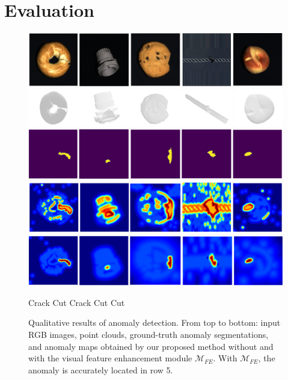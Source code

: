 \section*{Evaluation}
\label{sec:evaluation}

\begin{figure}[ht]
\centering
\includegraphics[width=\linewidth]{figs/result_rgb}
\includegraphics[width=\linewidth]{figs/result_pc}
\includegraphics[width=\linewidth]{figs/result_gt}
\includegraphics[width=\linewidth]{figs/result_baseline}
\includegraphics[width=\linewidth]{figs/result_ours}
\vspace{-0.5cm}

\begin{flushleft}
 \hspace{1.3cm} Crack \hspace{2.6cm} Cut  \hspace{2.6cm} Crack  \hspace{2.8cm} Cut  \hspace{2.5cm} Cut
 \end{flushleft}
 
 \vspace{-0.1cm}
\caption{Qualitative results of anomaly detection. From top to bottom: input RGB images, point clouds, ground-truth anomaly segmentations, and anomaly maps obtained by our proposed method without and with the visual feature enhancement module $\mathcal{M}_{FE}$. With $\mathcal{M}_{FE}$, the anomaly is accurately located in row 5.}
\label{fig:results1}
\end{figure}

